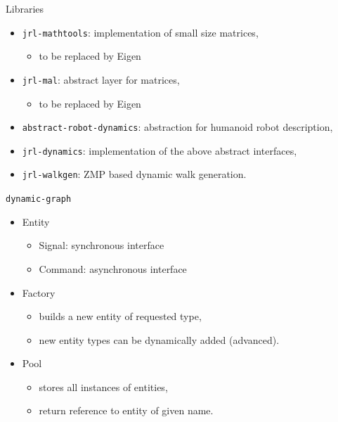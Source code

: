 %
%

\begin {frame} {Libraries}
  \begin{itemize}
  \item \texttt {jrl-mathtools}: implementation of small size matrices,
    \begin{itemize}
    \item to be replaced by Eigen
    \end{itemize}
    \pause
  \item \texttt {jrl-mal}: abstract layer for matrices,
    \begin{itemize}
    \item to be replaced by Eigen
    \end{itemize}
    \pause
  \item \texttt {abstract-robot-dynamics}: abstraction for humanoid robot description,
    \pause
  \item \texttt {jrl-dynamics}: implementation of the above abstract interfaces,
    \pause
  \item \texttt {jrl-walkgen}: ZMP based dynamic walk generation.
\end{itemize}
\end{frame}

%
%
\begin {frame} {\texttt{dynamic-graph}}
  \begin {itemize}
  \item Entity
    \begin{itemize}
    \item Signal: synchronous interface
    \item Command: asynchronous interface
    \end{itemize}
    \pause
  \item Factory
    \begin{itemize}
    \item builds a new entity of requested type,
    \item new entity types can be dynamically added (advanced).
    \end{itemize}
    \pause
  \item Pool
    \begin{itemize}
      \item stores all instances of entities,
      \item return reference to entity of given name.
    \end{itemize}
  \end{itemize}
\end {frame}

